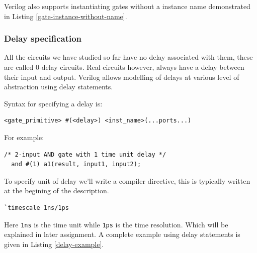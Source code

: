 \documentclass[a4paper,10pt]{article}
\theoremstyle{mytheor}
\newcommand{
  \insertverilog}[3]{
  
}
\begin{document}
\insertverilog{./verilog_files/gateLevelExample.v}{gate-level-impl}{\text{Example module using Gate-level modelling}}

Verilog also supports instantiating gates without a instance name
demonstrated in Listing \ref{gate-instance-without-name}.
\insertverilog{./verilog_files/unnamedGate.v}{gate-instance-without-name}{\text{Instantiating unnamed gates}}

\subsubsection{Delay specification}
All the circuits we have studied so far have no delay associated with
them, these are called 0-delay circuits. Real circuits however, always
have a delay between their input and output. Verilog allows modelling
of delays at various level of abstraction using delay statements.

Syntax for specifying a delay is:
\begin{lstlisting}[style=verilog-inline-style, xleftmargin=0.2\textwidth]
  <gate_primitive> #(<delay>) <inst_name>(...ports...) 
\end{lstlisting}

For example:
\begin{lstlisting}[style=verilog-inline-style, xleftmargin=0.25\textwidth]
  /* 2-input AND gate with 1 time unit delay */
  and #(1) a1(result, input1, input2);
\end{lstlisting}

\vspace{0.1cm}
To specify unit of delay we'll write a compiler
directive, this is typically written at the begining of the
description.

\begin{center}
  \begin{lstlisting}[style=verilog-inline-style,xleftmargin=.35\textwidth]
    `timescale 1ns/1ps
  \end{lstlisting}
\end{center}


Here \lstinline[upquote=true]{1ns} is the time unit while
\lstinline[upquote=true]{1ps} is the time resolution. Which will be
explained in later assignment. A complete example using delay
statements is given in Listing \ref{delay-example}.
\end{document}
